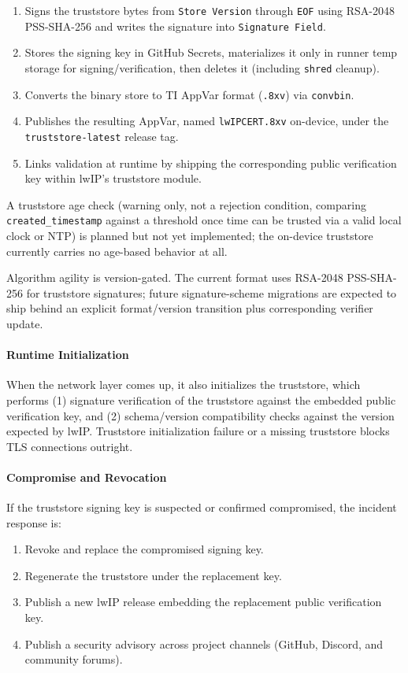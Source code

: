 \documentclass[titlepage]{report}
\begin{document}
\begin{enumerate}
		order until a root verifies the pending certificate signature.
		\item Signs the truststore bytes from \texttt{Store Version} through \texttt{EOF} using RSA-2048 PSS-SHA-256 and writes the signature into \texttt{Signature Field}.
		\item Stores the signing key in GitHub Secrets, materializes it only in runner temp storage for signing/verification, then deletes it (including \texttt{shred} cleanup).
		\item Converts the binary store to TI AppVar format (\texttt{.8xv}) via \texttt{convbin}.
		\item Publishes the resulting AppVar, named \texttt{lwIPCERT.8xv} on-device, under the \texttt{truststore-latest} release tag.
		\item Links validation at runtime by shipping the corresponding public verification key within lwIP's truststore module.
	\end{enumerate}
	
A truststore age check (warning only, not a rejection condition, comparing \texttt{created\_timestamp} against a threshold once time can be trusted via a valid local clock or NTP) is planned but not yet implemented; the on-device truststore currently carries no age-based behavior at all.
	
	Algorithm agility is version-gated. The current format uses RSA-2048 PSS-SHA-256 for truststore signatures; future signature-scheme migrations are expected to ship behind an explicit format/version transition plus corresponding verifier update.

	\paragraph{Runtime Initialization}
	When the network layer comes up, it also initializes the truststore, which performs (1) signature verification of the truststore against the embedded public verification key, and (2) schema/version compatibility checks against the version expected by lwIP. Truststore initialization failure or a missing truststore blocks TLS connections outright.

	\paragraph{Compromise and Revocation}
	If the truststore signing key is suspected or confirmed compromised, the incident response is:
	\begin{enumerate}
		\item Revoke and replace the compromised signing key.
		\item Regenerate the truststore under the replacement key.
		\item Publish a new lwIP release embedding the replacement public verification key.
		\item Publish a security advisory across project channels (GitHub, Discord, and community forums).
	\end{enumerate}
\end{document}
